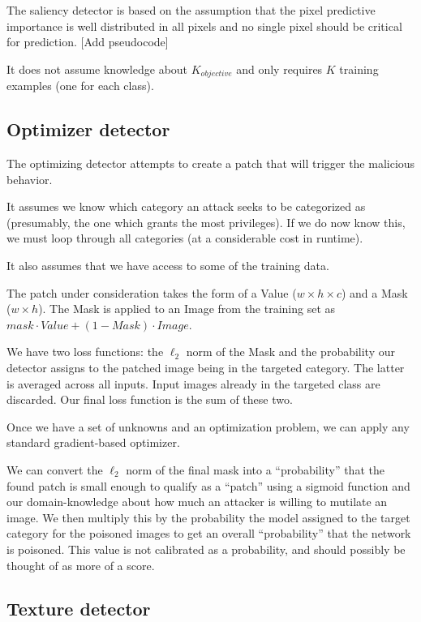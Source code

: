 \documentclass[letterpaper, 10 pt, conference]{ieeeconf}  %
\begin{document}
The saliency detector is based on the assumption that the pixel predictive importance is well distributed in all pixels and no single pixel should be critical for prediction. [Add pseudocode]

It does not assume knowledge about $K_{objective}$ and only requires $K$ training examples (one for each class).


\subsection{Optimizer detector}

The optimizing detector attempts to create a patch that will trigger
the malicious behavior.

It assumes we know which category an attack
seeks to be categorized as (presumably, the one which grants the most
privileges).  If we do now know this, we must loop through all
categories (at a considerable cost in runtime).

It also assumes that we have access to some of the training data.

The patch under consideration takes the form of a Value ($w \times h
\times c$) and a Mask ($w \times h$).  The Mask is applied to an
Image from the training set as $mask \cdot Value + (1 - Mask) \cdot
Image$.

We have two loss functions: the $\ell_2$ norm of the Mask and the
probability our detector assigns to the patched image being in the
targeted category.  The latter is averaged across all inputs.  Input
images already in the targeted class are discarded.  Our final loss
function is the sum of these two.

Once we have a set of unknowns and an optimization problem, we can
apply any standard gradient-based optimizer.

We can convert the $\ell_2$ norm of the final mask into a ``probability''
that the found patch is small enough to qualify as a ``patch'' using a
sigmoid function and our domain-knowledge about how much an attacker
is willing to mutilate an image.  We then multiply this by the
probability the model assigned to the target category for the poisoned
images to get an overall ``probability'' that the network is
poisoned.  This value is not calibrated as a probability, and should
possibly be thought of as more of a score.


\subsection{Texture detector}
\end{document}
